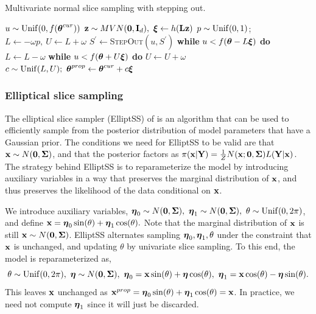 \begin{algorithm}[htbp]
	\caption{Multivariate normal slice sampling with stepping out.}\label{alg:mvnss}
	\begin{algorithmic}[1]
		\State $ u \sim \mathrm{Unif}(0,f(\boldsymbol{\theta}^{cur})) $
		\State $\mathbf{z}\sim MVN(\mathbf{0},\mathbf{I}_d),\ \boldsymbol{\xi}\gets h(\mathbf{L}\mathbf{z})$ 
		\State $ p\sim \mathrm{Unif}(0,1) $; $ L \gets - \omega p,\ U \gets L+\omega $ 
		\State $ S^\prime \gets $\textsc{StepOut}$ (u,S^\prime) $ 
		\State\hspace{\algorithmicindent}\textbf{while }{$ u<f(\boldsymbol{\theta} - L\boldsymbol{\xi}) $} \textbf{do} $ L \gets L-\omega $
		\State\hspace{\algorithmicindent}\textbf{while }{$u<f(\boldsymbol{\theta} + U\boldsymbol{\xi})$} \textbf{do} $ U \gets U+\omega $
		\State $ c \sim \mathrm{Unif}(L,U);\  \boldsymbol{\theta}^{prop}\gets \boldsymbol{\theta}^{cur} + c\boldsymbol{\xi} $ 
		\State\Return{$ \new{\btheta} $}
		\Else{}
		\EndIf 	
		\EndIf
		\EndProcedure
	\end{algorithmic}
\end{algorithm}

\subsubsection{Elliptical slice sampling}
\label{subsubsec:elliptical_slice_sampling}

The elliptical slice sampler (ElliptSS) of \cite{murray2010} is an algorithm that can be used to efficiently sample from the posterior distribution of model parameters that have a Gaussian prior. The conditions we need for ElliptSS to be valid are that $ \mathbf{x}\sim N(\mathbf{0}, \boldsymbol{\Sigma}) $, and that the posterior factors as $ \pi(\mathbf{x}|\mathbf{Y})= \frac{1}{Z}N(\mathbf{x};\boldsymbol{0}, \boldsymbol{\Sigma})L(\mathbf{Y}|\mathbf{x}) $. The strategy behind ElliptSS is to reparameterize the model by introducing auxiliary variables in a way that preserves the marginal distribution of $ \mathbf{x} $, and thus preserves the likelihood of the data conditional on $ \mathbf{x} $.

We introduce auxiliary variables, $
\boldsymbol{\eta}_0 \sim N(\boldsymbol{0}, \boldsymbol{\Sigma}),\
\boldsymbol{\eta}_1 \sim N(\boldsymbol{0}, \boldsymbol{\Sigma}),\
\theta \sim \mathrm{Unif}(0, 2\pi)$, and define $
\mathbf{x} = \boldsymbol{\eta}_0\sin(\theta) + \boldsymbol{\eta}_1\cos(\theta). $ Note that the marginal distribution of $ \mathbf{x} $ is still $ \mathbf{x}\sim N(\boldsymbol{0}, \boldsymbol{\Sigma}) $. ElliptSS alternates sampling $ \boldsymbol{\eta}_0,\boldsymbol{\eta}_1,\theta $ under the constraint that $ \mathbf{x} $ is unchanged, and updating $ \theta $ by univariate slice sampling. To this end, the model is reparameterized as, $$\theta \sim \mathrm{Unif}(0, 2\pi),\
\boldsymbol{\eta} \sim N(\boldsymbol{0}, \boldsymbol{\Sigma}),\
\boldsymbol{\eta}_0 = \mathbf{x} \sin(\theta) + \boldsymbol{\eta} \cos(\theta),\
\boldsymbol{\eta}_1 = \mathbf{x}\cos(\theta) - \boldsymbol{\eta}\sin(\theta).$$ This leaves $ \mathbf{x} $ unchanged as $ \mathbf{x}^{prop} = \boldsymbol{\eta}_0\sin(\theta) + \boldsymbol{\eta}_1\cos(\theta) = \mathbf{x}$. In practice, we need not compute $ \boldsymbol{\eta}_1 $ since it will just be discarded.


